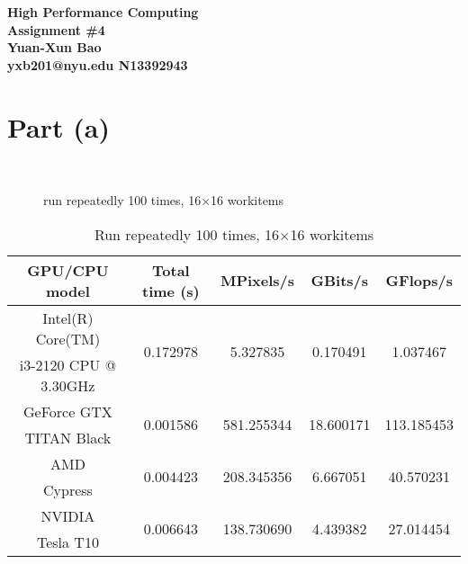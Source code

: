 \documentclass[12pt]{article}
\begin{document}
\begin{center}

\large \textbf{%
High Performance Computing \\ Assignment \#4 \\ Yuan-Xun Bao \\ yxb201@nyu.edu \quad N13392943}
\end{center}

\section{Part (a)}

\begin{figure}[h]
\centering
{} \\
\caption{run repeatedly 100 times, 16$\times$16 workitems}
\end{figure}

\begin{table}[h]
  \centering
  \begin{tabular}{ | c | c | c | c | c |}
    \hline
    GPU/CPU model & Total time (s) & MPixels/s & GBits/s & GFlops/s \\ \hline
     Intel(R) Core(TM)  & \multirow{2}{*}{0.172978} & \multirow{2}{*}{5.327835} & \multirow{2}{*}{0.170491}  & \multirow{2}{*}{1.037467}  \\ 
     i3-2120 CPU @ 3.30GHz & & & & \\ \hline
     GeForce GTX  & \multirow{2}{*}{0.001586} & \multirow{2}{*}{581.255344} & \multirow{2}{*}{18.600171} & \multirow{2}{*}{113.185453} \\ 
     TITAN Black & & & &  \\ \hline
    AMD &  \multirow{2}{*}{0.004423} &  \multirow{2}{*}{208.345356} &  \multirow{2}{*}{6.667051}  &  \multirow{2}{*}{40.570231} \\
    Cypress & & & & \\ \hline
    NVIDIA & \multirow{2}{*}{0.006643} & \multirow{2}{*}{138.730690} & \multirow{2}{*}{4.439382} & \multirow{2}{*}{27.014454} \\
    Tesla T10 & & & & \\ \hline
  \end{tabular}
    \caption{Run repeatedly 100 times, 16$\times$16 workitems}
\end{table}
\end{document}
